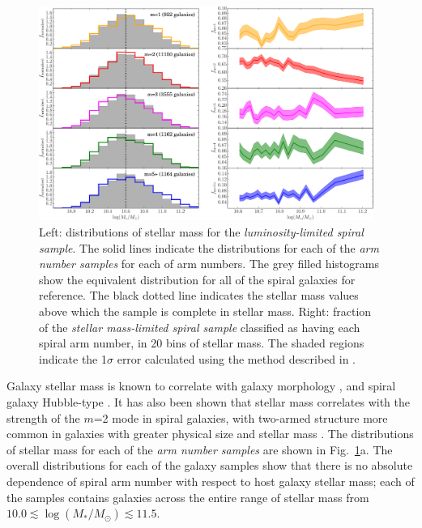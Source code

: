 \documentclass[useAMS,usenatbib]{mn2e}
\begin{document}
\begin{figure}
		\centering

        \includegraphics[width=0.975\textwidth]{Images/Results/mass_plots.pdf}

        \caption{Left: distributions of stellar mass for the \textit{luminosity-limited spiral sample}. The solid lines indicate the distributions for each of the \textit{arm number samples} for each of arm numbers. The grey filled histograms show the equivalent distribution for all of the spiral galaxies for reference. The black dotted line indicates the stellar mass values above which the sample is complete in stellar mass. Right: fraction of the \textit{stellar mass-limited spiral sample} classified as having each spiral arm number, in 20 bins of stellar mass. The shaded regions indicate the 1$\sigma$ error calculated using the method described in \citet{Cameron_11}.}

        \label{fig:mass_plots}

\end{figure}

Galaxy stellar mass is known to correlate with galaxy morphology \citep{Bamford_09,Kelvin_14}, and spiral galaxy Hubble-type \citep{Munoz-Mateos_15}. It has also been shown that stellar mass correlates with the strength of the $m$=2 mode in spiral galaxies, with two-armed structure more common in galaxies with greater physical size \citep{EE_87} and stellar mass \citep{Kendall_15}. The distributions of stellar mass for each of the \textit{arm number samples} are shown in Fig.~\ref{fig:mass_plots}a. The overall distributions for each of the galaxy samples show that there is no absolute dependence of spiral arm number with respect to host galaxy stellar mass; each of the samples contains galaxies across the entire range of stellar mass from $10.0 \lesssim \log(M_*/M_{\odot}) \lesssim 11.5$. 
\end{document}
